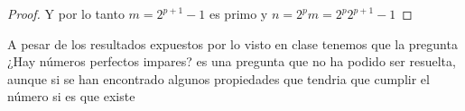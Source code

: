 \documentclass[12pt]{article}
\begin{document}
\begin{enumerate}
\begin{itemize}
\begin{proof}
                Y por lo tanto $m = 2^{p+1} - 1$ es primo y $n = 2^{p}m = 2^{p}2^{p+1} - 1$
            \end{proof}
            
            
            A pesar de los resultados expuestos por lo visto en clase tenemos que la pregunta ¿Hay números perfectos impares? es una
            pregunta que no ha podido ser resuelta, aunque si se han encontrado algunos propiedades que tendria que cumplir el número si es que 
            existe
            
        \end{itemize}
        
        \end{enumerate}







\end{document}
